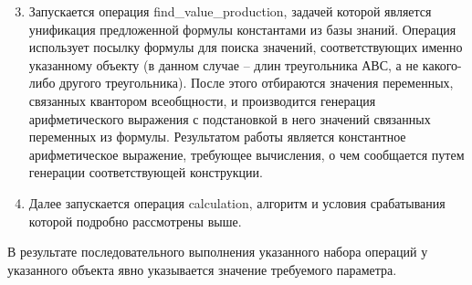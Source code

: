 \begin{enumerate}
	\setcounter{enumi}{2}
	\item
	Запускается операция find\_value\_production, задачей которой является унификация предложенной формулы константами из базы знаний. Операция использует посылку формулы для поиска значений, соответствующих именно указанному объекту (в данном случае -- длин треугольника АВС, а не какого-либо другого треугольника). После этого отбираются значения переменных, связанных квантором всеобщности, и производится генерация арифметического выражения с подстановкой в него значений связанных переменных из формулы. Результатом работы является константное арифметическое выражение, требующее вычисления, о чем сообщается путем генерации соответствующей конструкции.
	\item
	Далее запускается операция calculation, алгоритм и условия срабатывания которой подробно рассмотрены выше.
\end{enumerate}

В результате последовательного выполнения указанного набора операций у указанного объекта явно указывается значение требуемого параметра.